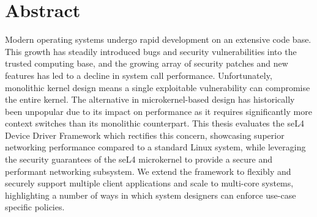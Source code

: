 \chapter{Abstract}\label{ch:abstract}

Modern operating systems undergo rapid development on an extensive code base. 
This growth has steadily introduced bugs and security vulnerabilities into the trusted computing base,
and the growing array of security patches and new features has led to a decline in system call performance.
Unfortunately, monolithic kernel design means a single exploitable vulnerability can compromise the entire kernel.
The alternative in microkernel-based design has historically been unpopular due to its impact on performance
as it requires significantly more context switches than its monolithic counterpart. This thesis evaluates the
seL4 Device Driver Framework which rectifies this concern, showcasing superior networking performance
compared to a standard Linux system, while leveraging the security guarantees
of the seL4 microkernel to provide a secure and performant networking subsystem. We extend the framework
to flexibly and securely support multiple client applications and scale to multi-core systems, 
highlighting a number of ways in which system designers can enforce use-case specific policies. 
